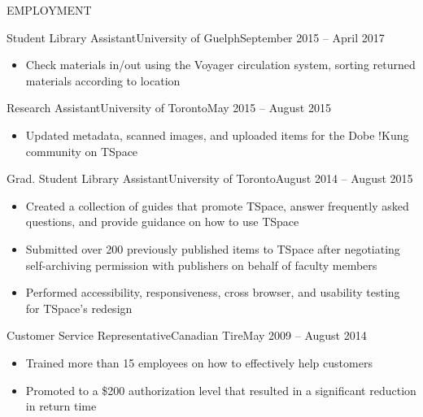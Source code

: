 \documentclass[]{mcdowellcv}
\begin{document}
	\makeheader
	
	\begin{cvsection}{EMPLOYMENT}
		\begin{cvsubsection}{Student Library Assistant}{University of Guelph}{September 2015 -- April 2017}
			\begin{itemize}
				\item Check materials in/out using the Voyager circulation system, sorting returned materials according to location
			\end{itemize}
		\end{cvsubsection}
		
		\begin{cvsubsection}{Research Assistant}{University of Toronto}{May 2015 -- August 2015}	
			\begin{itemize}
				\item Updated metadata, scanned images, and uploaded items for the Dobe !Kung community on TSpace
			\end{itemize}
		\end{cvsubsection}
		
		\begin{cvsubsection}{Grad. Student Library Assistant}{University of Toronto}{August 2014 -- August 2015}		
			\begin{itemize}
				\item Created a collection of guides that promote TSpace, answer frequently asked questions, and provide guidance on how to use TSpace
                \item Submitted over 200 previously published items to TSpace after negotiating self-archiving permission with publishers on behalf of faculty members
                \item Performed accessibility, responsiveness, cross browser, and usability testing for TSpace's redesign
			\end{itemize}
		\end{cvsubsection}
		
		\begin{cvsubsection}{Customer Service Representative}{Canadian Tire}{May 2009 -- August 2014}
			\begin{itemize}
				\item Trained more than 15 employees on how to effectively help customers
				\item Promoted to a \$200 authorization level that resulted in a significant reduction in return time
			\end{itemize}
		\end{cvsubsection}
	\end{cvsection}
	
\end{document}
